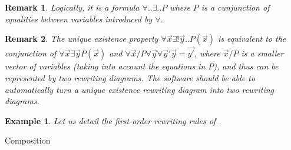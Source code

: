 \documentclass{article}
\newtheorem{example}{Example}[section]
\newtheorem{remark}{Remark}[section]
\begin{document}
\begin{remark}
    \label{rem:formula-fo}
   Logically, it is a formula $∀ .. ∃ .. P $ where $P$ is a cunjunction of equalities between variables introduced by $∀ $.    
\end{remark}
\begin{remark}
    The unique existence property $∀ \vec{x}∃ !\vec{y}  .. P(\vec{x})$ is equivalent to the conjunction of 
    $ ∀ \vec{x}∃ \vec{y}  P(\vec{x})$ and $∀ \vec{x}/P ∀ \vec{y} ∀ \vec{y}' \vec{y}=\vec{y'} $, where $\vec{x}/P$ is a smaller vector of variables (taking into account the equations in $P$), and thus can be represented by two rewriting diagrams.
    The software should be able to automatically turn 
    a unique existence rewriting diagram into two rewriting diagrams.
\end{remark}
\begin{example}
    Let us detail the first-order rewriting rules of .

    \begin{description}
        \item[Composition] 
   
\begin{equation}

\label{eq:rew-comp}
\tag{Comp}
\end{equation}



\end{description}
\end{example}
\end{document}
